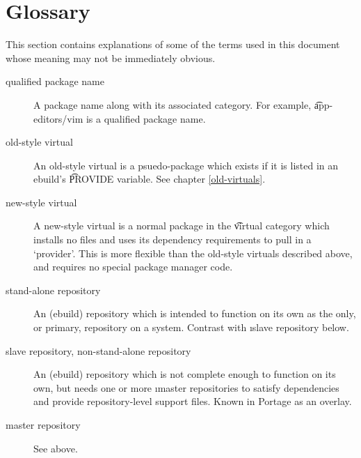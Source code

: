 \chapter{Glossary}
\label{glossary}

This section contains explanations of some of the terms used in this document whose meaning may not
be immediately obvious.

\begin{description}
\item[qualified package name] A package name along with its associated category. For example,
    \t{app-editors/vim} is a qualified package name.
\item[old-style virtual] An old-style virtual is a psuedo-package which exists if it is listed in an
    ebuild's \t{PROVIDE} variable. See chapter \ref{old-virtuals}.
\item[new-style virtual] A new-style virtual is a normal package in the \t{virtual} category which
    installs no files and uses its dependency requirements to pull in a `provider'. This is more
    flexible than the old-style virtuals described above, and requires no special package manager
    code.
\item[stand-alone repository] An (ebuild) repository which is intended to function on its own as the
    only, or primary, repository on a system. Contrast with \i{slave repository} below.
\item[slave repository, non-stand-alone repository] An (ebuild) repository which is not complete
    enough to function on its own, but needs one or more \i{master repositories} to
    satisfy dependencies and provide repository-level support files. Known in Portage as an overlay.
\item[master repository] See above.

\end{description}


